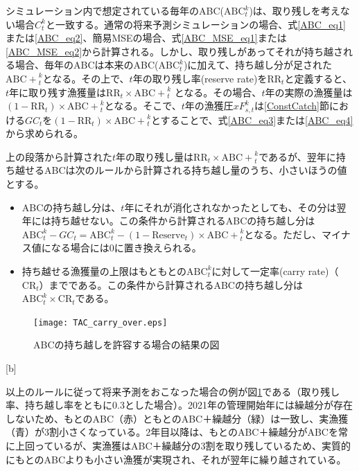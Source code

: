 \documentclass[11pt]{jsarticle}
\begin{document}
シミュレーション内で想定されている毎年のABC($\mathrm{ABC}_t^k$)は、取り残しを考えない場合$C_t^k$と一致する。通常の将来予測シミュレーションの場合、式\ref{ABC_eq1}または\ref{ABC_eq2}、簡易MSEの場合、式\ref{ABC_MSE_eq1}または\ref{ABC_MSE_eq2}から計算される。しかし、取り残しがあってそれが持ち越される場合、毎年のABCは本来のABC($\mathrm{ABC}_t^k$)に加えて、持ち越し分が足された$\mathrm{ABC+}_t^k$となる。その上で、$t$年の取り残し率(reserve rate)を$\mathrm{RR}_t$と定義すると、$t$年に取り残す漁獲量は$\mathrm{RR}_t \times \mathrm{ABC+}_{t}^{k}$ となる。その場合、$t$年の実際の漁獲量は$(1-\mathrm{RR}_t) \times \mathrm{ABC+}_{t}^{k}$となる。そこで、$t$年の漁獲圧$xF_{s,t}^k$は\ref{ConstCatch}節における$GC_{t}$を$(1-\mathrm{RR}_t) \times \mathrm{ABC+}_{t}^{k}$とすることで、式\ref{ABC_eq3}または\ref{ABC_eq4}から求められる。

上の段落から計算された$t$年の取り残し量は$\mathrm{RR}_t \times \mathrm{ABC+}_{t}^{k}$であるが、翌年に持ち越せるABCは次のルールから計算される持ち越し量のうち、小さいほうの値とする。
\begin{itemize}
\item ABCの持ち越し分は、$t$年にそれが消化されなかったとしても、その分は翌年には持ち越せない。この条件から計算されるABCの持ち越し分は $\mathrm{ABC}_t^k-GC_{t} = \mathrm{ABC}_t^k-(1-\mathrm{Reserve}_t) \times \mathrm{ABC+}_{t}^{k}$となる。ただし、マイナス値になる場合には0に置き換えられる。
\item 持ち越せる漁獲量の上限はもともとの$\mathrm{ABC}_t^k$に対して一定率(carry rate)（$\mathrm{CR}_t$）までである。この条件から計算されるABCの持ち越し分は$\mathrm{ABC}_t^k \times \mathrm{CR}_t$である。
\end{itemize}

\begin{figure}[b]
  \texttt{[image: TAC\_carry\_over.eps]}    
  \caption{
    ABCの持ち越しを許容する場合の結果の図
  }
  \label{fig_carry_over}
\end{figure}[b]

以上のルールに従って将来予測をおこなった場合の例が図\ref{fig_carry_over}である（取り残し率、持ち越し率をともに0.3とした場合）。2021年の管理開始年には繰越分が存在しないため、もとのABC（赤）ともとのABC＋繰越分（緑）は一致し、実漁獲（青）が3割小さくなっている。2年目以降は、もとのABC＋繰越分がABCを常に上回っているが、実漁獲はABC＋繰越分の3割を取り残しているため、実質的にもとのABCよりも小さい漁獲が実現され、それが翌年に繰り越されている。
\end{document}
